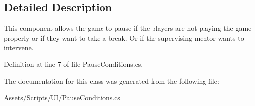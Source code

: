 \subsection{Detailed Description}
This component allows the game to pause if the players are not playing the game properly or if they want to take a break. Or if the supervising mentor wants to intervene. 



Definition at line 7 of file Pause\+Conditions.\+cs.



The documentation for this class was generated from the following file\+:\begin{DoxyCompactItemize}
\item 
Assets/\+Scripts/\+U\+I/Pause\+Conditions.\+cs\end{DoxyCompactItemize}
